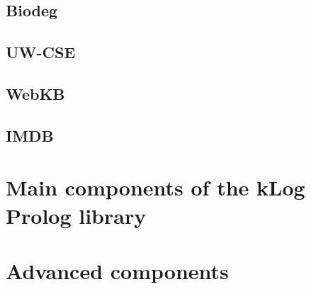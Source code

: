 \documentclass[a4,11pt]{memoir}
\begin{document}
\section{Biodeg}
\section{UW-CSE}
\section{WebKB}
\section{IMDB}


\chapter{Main components of the kLog Prolog library}








\chapter{Advanced components}





\backmatter
{}

\clearpage
\twocolindex
\renewcommand{\preindexhook}{%
The first page number is usually, but not always, the primary reference to
the indexed topic.\vskip\onelineskip}
\indexintoc

\printindex
\end{document}
